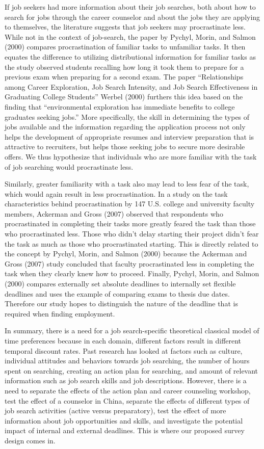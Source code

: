 \documentclass[]{elsarticle} %
\begin{document}
If job seekers had more information about their job searches, both about
how to search for jobs through the career counselor and about the jobs
they are applying to themselves, the literature suggests that job
seekers may procrastinate less. While not in the context of job-search,
the paper by Pychyl, Morin, and Salmon (2000) compares procrastination
of familiar tasks to unfamiliar tasks. It then equates the difference to
utilizing distributional information for familiar tasks as the study
observed students recalling how long it took them to prepare for a
previous exam when preparing for a second exam. The paper
``Relationships among Career Exploration, Job Search Intensity, and Job
Search Effectiveness in Graduating College Students'' Werbel (2000)
furthers this idea based on the finding that ``environmental exploration
has immediate benefits to college graduates seeking jobs.'' More
specifically, the skill in determining the types of jobs available and
the information regarding the application process not only helps the
development of appropriate resumes and interview preparation that is
attractive to recruiters, but helps those seeking jobs to secure more
desirable offers. We thus hypothesize that individuals who are more
familiar with the task of job searching would procrastinate less.

Similarly, greater familiarity with a task also may lead to less fear of
the task, which would again result in less procrastination. In a study
on the task characteristics behind procrastination by 147 U.S. college
and university faculty members, Ackerman and Gross (2007) observed that
respondents who procrastinated in completing their tasks more greatly
feared the task than those who procrastinated less. Those who didn't
delay starting their project didn't fear the task as much as those who
procrastinated starting. This is directly related to the concept by
Pychyl, Morin, and Salmon (2000) because the Ackerman and Gross (2007)
study concluded that faculty procrastinated less in completing the task
when they clearly knew how to proceed. Finally, Pychyl, Morin, and
Salmon (2000) compares externally set absolute deadlines to internally
set flexible deadlines and uses the example of comparing exams to thesis
due dates. Therefore our study hopes to distinguish the nature of the
deadline that is required when finding employment.

In summary, there is a need for a job search-specific theoretical
classical model of time preferences because in each domain, different
factors result in different temporal discount rates. Past research has
looked at factors such as culture, individual attitudes and behaviors
towards job searching, the number of hours spent on searching, creating
an action plan for searching, and amount of relevant information such as
job search skills and job descriptions. However, there is a need to
separate the effects of the action plan and career counseling workshop,
test the effect of a counselor in China, separate the effects of
different types of job search activities (active versus preparatory),
test the effect of more information about job opportunities and skills,
and investigate the potential impact of internal and external deadlines.
This is where our proposed survey design comes in.
\end{document}
